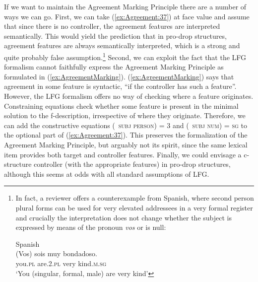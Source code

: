 \documentclass[output=paper,hidelinks]{langscibook}
\begin{document}
%
If we want to maintain the Agreement Marking Principle there are a
number of ways we can go.  First, we can take (\ref{ex:Agreement:37}) at face value and
assume that since there is no controller, the agreement features are
interpreted semantically. This would yield the prediction that in
pro-drop structures, agreement features are always semantically
interpreted, which is a strong and quite probably false
assumption.\footnote{In fact, a reviewer offers a counterexample from Spanish, where second person plural forms can be used for very elevated addressees in a very formal register and crucially the interpretation does not change whether the subject is expressed by means of
the pronoun \textit{vos} or is null:

\ea Spanish\\
\gll (Vos) sois muy bondadoso.\\
you.\textsc{pl} are.\textsc{2.pl} very kind.\textsc{m.sg}\\
\glt `You (singular, formal, male) are very kind'
\z
} Second, we can exploit the fact that the LFG formalism
cannot faithfully express the Agreement Marking Principle as
formulated in (\ref{ex:AgreementMarking}). (\ref{ex:AgreementMarking})
says that agreement in some feature is syntactic, ``if the controller
has such a feature''. However, the LFG formalism offers no way of
checking where a feature originates. Constraining equations check
whether some feature is present in the minimal solution to the
f-description, irrespective of where they originate. Therefore, we can
add the constructive equations (\UP\ \textsc{subj person}) = 3 and
(\UP\ \textsc{subj num}) = \textsc{sg} to the optional part of
(\ref{ex:Agreement:37}). This preserves the formalization of the Agreement Marking
Principle, but arguably not its spirit, since the same lexical item
provides both target and controller features. Finally, we could
envisage a c-structure controller (with the appropriate features) in
pro-drop structures, although this seems at odds with all standard
assumptions of LFG.
\end{document}
